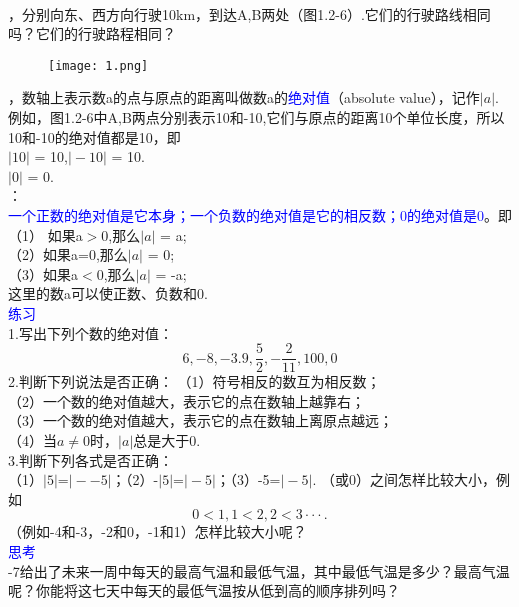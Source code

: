 \documentclass[UTF8]{article}
\begin{document}
	\\
	，分别向东、西方向行驶10km，到达A,B两处（图1.2-6）.它们的行驶路线相同吗？它们的行驶路程相同？\\
	\begin{figure}[ht]
		\centering
		\texttt{[image: 1.png]}
	\end{figure}

	，数轴上表示数a的点与原点的距离叫做数a的\textcolor{blue}{绝对值}（absolute value），记作$\vert a \vert$.例如，图1.2-6中A,B两点分别表示10和-10,它们与原点的距离10个单位长度，所以10和-10的绝对值都是10，即\\
	\indent$\vert 10 \vert$ = 10,$\vert -10 \vert$ = 10.\\
	$\vert 0 \vert$ = 0.\\
	：\\
	\indent\textcolor{blue}{一个正数的绝对值是它本身；一个负数的绝对值是它的相反数；0的绝对值是0}。即\\
	\indent（1） 如果a$>$0,那么$\vert a \vert$ = a;\\
	\indent（2）如果a=0,那么$\vert a \vert$ = 0;\\
	\indent（3）如果a$<$0,那么$\vert a \vert$ = -a;\\
	\indent 这里的数a可以使正数、负数和0.\\
	\textcolor{blue}{\heiti 练习}\\
	1.写出下列个数的绝对值：\\
	$$6,-8,-3.9,\frac{5}{2},-\frac{2}{11},100,0$$
	2.判断下列说法是否正确：
	\indent（1）符号相反的数互为相反数；\\
	\indent（2）一个数的绝对值越大，表示它的点在数轴上越靠右；\\
	\indent（3）一个数的绝对值越大，表示它的点在数轴上离原点越远；\\
	\indent（4）当$a\neq0$时，$\vert a \vert$总是大于0.\\
	3.判断下列各式是否正确：\\
	（1）$\vert 5 \vert$=$\vert --5 \vert$；（2）-$\vert 5 \vert$=$\vert -5 \vert$；（3）-5=$\vert -5 \vert$.
	（或0）之间怎样比较大小，例如\\
	$$0<1,1<2,2<3···.$$
	（例如-4和-3，-2和0，-1和1）怎样比较大小呢？\\
	\textcolor{blue}{\heiti 思考}\\
	-7给出了未来一周中每天的最高气温和最低气温，其中最低气温是多少？最高气温呢？你能将这七天中每天的最低气温按从低到高的顺序排列吗？\\
\end{document}
